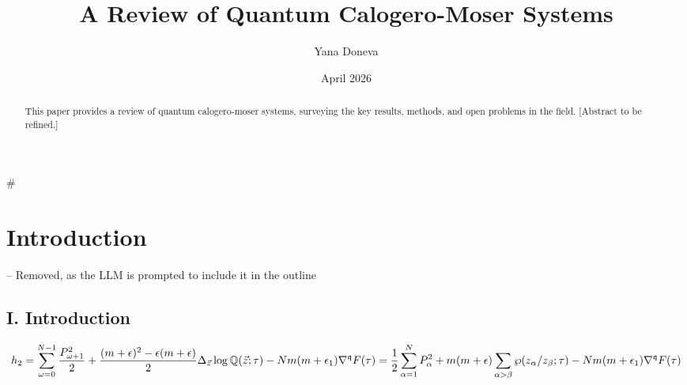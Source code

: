 \documentclass[12pt]{article}
\title{A Review of Quantum Calogero-Moser Systems}
\author{Yana Doneva}
\date{April 2026}
\begin{document}
                                                                                                                                                                                                 
                                                                                                                                                                                                                    
\maketitle                                                                                                                                                                                                         

\begin{abstract}                                                                                                                                                                                                 
This paper provides a review of quantum calogero-moser systems, surveying the key results,
methods, and open problems in the field. [Abstract to be refined.]                                                                                                                                                  
\end{abstract}                                                                                                                                                                                                   
                                                                                                                                                                                                                    
\tableofcontents                                                                                                                                                                                                   
                
# \section{Introduction} -- Removed, as the LLM is prompted to include it in the outline
                
\subsection{I. Introduction}
 \begin{equation}
    h_2 = \sum_{\omega=0}^{N-1}\frac{P_{\omega+1}^2}{2}+\frac{(m+\epsilon)^2-\epsilon(m+\epsilon)}{2}\Delta_{\vec{z}}\log\mathbb{Q}(\vec{z};\tau)- Nm(m+\epsilon_1)\nabla^\mathfrak{q}F(\tau) = \\
    \frac{1}{2}\sum_{\alpha=1}^N{P_\alpha^2}+m(m+\epsilon)\sum_{\alpha>\beta}\wp(z_\alpha/z_\beta;\tau)-Nm(m+\epsilon_1)\nabla^\mathfrak{q}F(\tau)
\end{equation}
\end{document}
